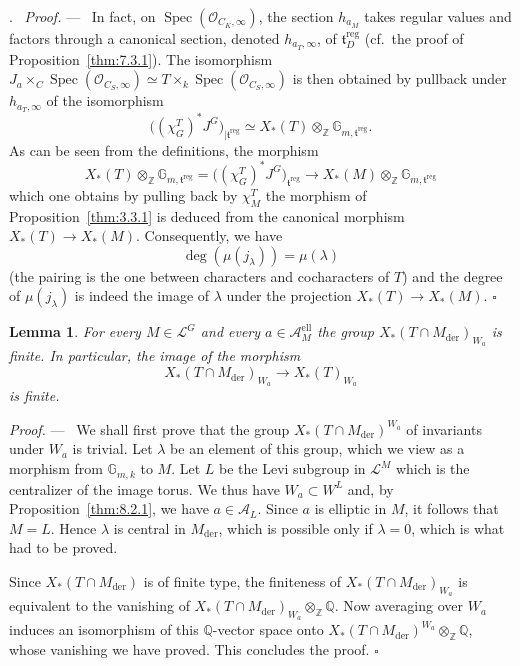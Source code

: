 \documentclass[12pt,a4paper,oneside,english,leqno]{smfart}
\makeatletter
\numberwithin{equation}{subsection}
\newcounter{theo}
\numberwithin{theo}{subsection}
\newenvironment{paragr}[1][]{\medskip\refstepcounter{subsection}%
  \par\noindent\hspace*{\parindent}\thesubsection.\ \emph{#1}%
  \@ifundefined{@empty}{}{}\ignorespaces}{\medskip}
\theoremstyle{plain}
\newtheorem{lemma}[theo]{Lemma}
\theoremstyle{definition}
\theoremstyle{remark}
\newenvironment{preuve}[1][]{\medskip\noindent\textit{Proof.} #1 ---\ }%
  {\hfill\ensuremath{\square}\medskip}
\DeclareMathOperator{\reg}{reg}
\DeclareMathOperator{\der}{der}
\DeclareMathOperator{\el}{ell}
\DeclareMathOperator{\Spec}{Spec}
\newcommand{\ZZ}{\mathbb{Z}}
\newcommand{\Gmk}{\mathbb{G}_{m,k}}
\newcommand{\QQ}{\mathbb{Q}}
\newcommand{\oc}{\mathcal{O}}
\newcommand{\lc}{\mathcal{L}}
\newcommand{\Ac}{\mathcal{A}}
\newcommand{\tgo}{\mathfrak{t}}
\makeatother
\begin{document}
\begin{paragr}
\begin{preuve}
In fact, on $\Spec(\oc_{C_K,\infty})$, the section $h_{a_M}$ takes regular values and factors through a canonical section, denoted $h_{a_T,\infty}$, of $\tgo_D^{\reg}$ (cf.\ the proof of Proposition~\ref{thm:7.3.1}). The isomorphism $J_a\times_C\Spec(\oc_{C_S,\infty})\simeq T\times_k\Spec(\oc_{C_S,\infty})$ is then obtained by pullback under $h_{a_T,\infty}$ of the isomorphism
$$
\bigl((\chi^T_G)^*J^G\bigr)_{|\tgo^{\reg}}\simeq X_*(T)\otimes_{\ZZ}\mathbb{G}_{m,\tgo^{\reg}}.
$$
As can be seen from the definitions, the morphism
$$
X_*(T)\otimes_{\ZZ}\mathbb{G}_{m,\tgo^{\reg}}=\bigl((\chi^T_G)^*J^G\bigr)_{\tgo^{\reg}}\to X_*(M)\otimes_{\ZZ}\mathbb{G}_{m,\tgo^{\reg}}
$$
which one obtains by pulling back by $\chi^T_M$ the morphism of Proposition~\ref{thm:3.3.1} is deduced from the canonical morphism $X_*(T)\to X_*(M)$. Consequently, we have
$$
\deg(\mu(j_\lambda))=\mu(\lambda)
$$
(the pairing is the one between characters and cocharacters of $T$) and the degree of $\mu(j_\lambda)$ is indeed the image of $\lambda$ under the projection $X_*(T)\to X_*(M)$.
\end{preuve}

\begin{lemma}\label{thm:8.3.3}
For every $M\in\lc^G$ and every $a\in\Ac_M^{\el}$ the group $X_*(T\cap M_{\der})_{W_a}$ is finite. In particular, the image of the morphism
$$
X_*(T\cap M_{\der})_{W_a}\to X_*(T)_{W_a}
$$
is finite.
\end{lemma}

\begin{preuve}
We shall first prove that the group $X_*(T\cap M_{\der})^{W_a}$ of invariants under $W_a$ is trivial. Let $\lambda$ be an element of this group, which we view as a morphism from $\Gmk$ to $M$. Let $L$ be the Levi subgroup in $\lc^M$ which is the centralizer of the image torus. We thus have $W_a\subset W^L$ and, by Proposition~\ref{thm:8.2.1}, we have $a\in\Ac_L$. Since $a$ is elliptic in $M$, it follows that $M=L$. Hence $\lambda$ is central in $M_{\der}$, which is possible only if $\lambda=0$, which is what had to be proved.

Since $X_*(T\cap M_{\der})$ is of finite type, the finiteness of $X_*(T\cap M_{\der})_{W_a}$ is equivalent to the vanishing of $X_*(T\cap M_{\der})_{W_a}\otimes_{\ZZ}\QQ$. Now averaging over $W_a$ induces an isomorphism of this $\QQ$-vector space onto $X_*(T\cap M_{\der})^{W_a}\otimes_{\ZZ}\QQ$, whose vanishing we have proved. This concludes the proof.
\end{preuve}
\end{paragr}
\end{document}
